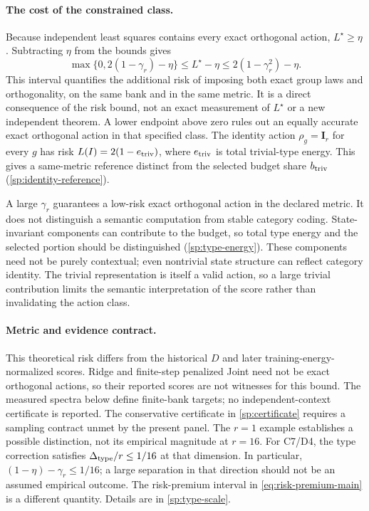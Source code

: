 \documentclass[10pt]{article}
\newcommand{\Id}{\mathbf{I}}
\begin{document}
\paragraph{The cost of the constrained class.}
Because independent least squares contains every exact orthogonal action, $L^\star\ge\eta$. Subtracting $\eta$ from the bounds gives
\begin{equation}
 \max\{0,2(1-\gamma_r)-\eta\}
 \le L^\star-\eta
 \le 2(1-\gamma_r^2)-\eta.
 \label{eq:risk-premium-main}
\end{equation}
This interval quantifies the additional risk of imposing both exact group laws and orthogonality, on the same bank and in the same metric. It is a direct consequence of the risk bound, not an exact measurement of $L^\star$ or a new independent theorem. A lower endpoint above zero rules out an equally accurate exact orthogonal action in that specified class. The identity action $\rho_g=\Id_r$ for every $g$ has risk $L(I)=2(1-e_{\rm triv})$, where $e_{\rm triv}$ is total trivial-type energy. This gives a same-metric reference distinct from the selected budget share $b_{\rm triv}$ (\cref{sp:identity-reference}).

A large $\gamma_r$ guarantees a low-risk exact orthogonal action in the declared metric. It does not distinguish a semantic computation from stable category coding. State-invariant components can contribute to the budget, so total type energy and the selected portion should be distinguished (\cref{sp:type-energy}). These components need not be purely contextual; even nontrivial state structure can reflect category identity. The trivial representation is itself a valid action, so a large trivial contribution limits the semantic interpretation of the score rather than invalidating the action class.

\paragraph{Metric and evidence contract.}
This theoretical risk differs from the historical $D$ and later training-energy-normalized scores. Ridge and finite-step penalized Joint need not be exact orthogonal actions, so their reported scores are not witnesses for this bound. The measured spectra below define finite-bank targets; no independent-context certificate is reported. The conservative certificate in \cref{sp:certificate} requires a sampling contract unmet by the present panel. The $r=1$ example establishes a possible distinction, not its empirical magnitude at $r=16$. For C7/D4, the type correction satisfies $\Delta_{\rm type}/r\le1/16$ at that dimension. In particular, $(1-\eta)-\gamma_r\le1/16$; a large separation in that direction should not be an assumed empirical outcome. The risk-premium interval in \cref{eq:risk-premium-main} is a different quantity. Details are in \cref{sp:type-scale}.
\end{document}
